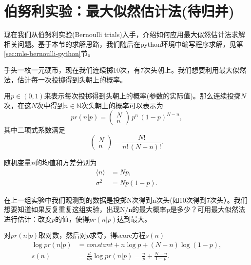 \section{伯努利实验：最大似然估计法(待归并)}
\label{sec:mle-bernoulli}

现在我们从伯努利实验(Bernoulli trials)入手，介绍如何应用最大似然估计法求解相关问题。基于本节的求解思路，我们随后在python环境中编写程序求解，见第\ref{sec:mle-bernoulli-python}节。

手头一枚一元硬币，现在我们连续掷10次，有7次头朝上。我们想要利用最大似然法，估计每一次投掷得到头朝上的概率。

用$p\in (0,1)$来表示每次投掷得到头朝上的概率(参数的实际值)。那么连续投掷$N$次，在这$N$次中得到$n \in \mathbb{N}$次头朝上的概率可以表示为
\begin{equation}
  \label{eq:mle-bernoulli-head-prob}
  pr \left( n | p \right) = \begin{pmatrix}
  N \\ n
\end{pmatrix} \, p^{n} \, \left( 1 - p \right)^{N-n},
\end{equation}
其中二项式系数满足
\begin{equation}
  \label{eq:mle-bernoulli-head-prob-binomial}
  \begin{pmatrix}
  N \\ n
\end{pmatrix} = \frac{N!}{n! \, \left(N - n \right)!}.
\end{equation}

随机变量$n$的均值和方差分别为
\begin{align}
  \label{eq:mle-random-n-mean}
  \langle n \rangle & = N p, \\
  \label{eq:mle-random-n-variation}
  \sigma^{2} &= N p (1-p).
\end{align}

在上一组实验中我们观测到的数据是投掷N次得到n次头(如10次得到7次头）。我们想要知道如果反复重复这组实验，出现N/n的最大概率p是多少？可用最大似然法进行估计：改变$p$的值，使得$pr(n | p)$达到最大。

对$pr(n | p)$取对数，然后对$p$求导，得score方程$s(n)$
\begin{equation}
  \label{eq:mle-bernoulli-score}
  \begin{split}
      \log pr(n | p) & = constant + n \log p + (N-n) \log (1-p), \\
      s(n) & = \frac{d}{d p} \log pr(n | p) = \frac{n}{p} + \frac{N - n}{1 - p}.
  \end{split}
\end{equation}

